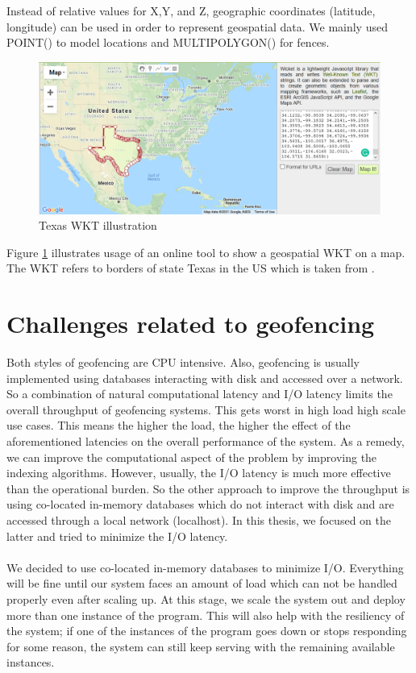 \documentclass[a4]{report}
\begin{document}
    Instead of relative values for X,Y, and Z, geographic coordinates (latitude, longitude) can be used in order to
    represent geospatial data.
    We mainly used POINT() to model locations and MULTIPOLYGON() for fences.

    \begin{figure}[ht]
        \centering
        \caption{Texas WKT illustration}
        \label{fig:texas}
        \includegraphics[width=\linewidth, scale=0.5]{images/texas.png}
    \end{figure}
    Figure \ref{fig:texas} illustrates usage of an online tool \cite{WKTtool} to show a geospatial WKT on a map.
    The WKT refers to borders of state Texas in the US which is taken from \cite{WKTs}.


    \section{Challenges related to geofencing}
    Both styles of geofencing are CPU intensive.
    Also, geofencing is usually implemented using databases interacting with disk and accessed over a network.
    So a combination of natural computational latency and I/O latency limits the overall throughput of geofencing systems.
    This gets worst in high load high scale use cases.
    This means the higher the load, the higher the effect of the aforementioned latencies on the overall performance of the system.
    As a remedy, we can improve the computational aspect of the problem by improving the indexing algorithms.
    However, usually, the I/O latency is much more effective than the operational burden.
    So the other approach to improve the throughput is using co-located in-memory databases which do not interact with disk and are accessed through a local network (localhost).
    In this thesis, we focused on the latter and tried to minimize the I/O latency.

    \paragraph{}
    We decided to use co-located in-memory databases to minimize I/O.
    Everything will be fine until our system faces an amount of load which can not be handled properly even after scaling up.
    At this stage, we scale the system out and deploy more than one instance of the program.
    This will also help with the resiliency of the system;
    if one of the instances of the program goes down or stops responding for some reason, the system can still keep serving with the remaining available instances.
\end{document}
